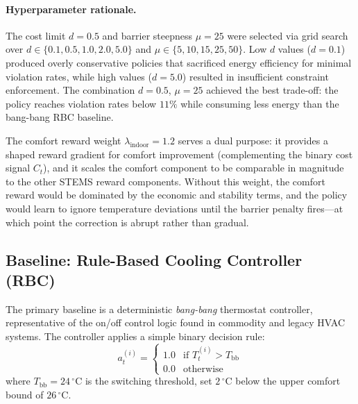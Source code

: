 \paragraph{Hyperparameter rationale.}
The cost limit $d = 0.5$ and barrier steepness $\mu = 25$ were selected via
grid search over $d \in \{0.1, 0.5, 1.0, 2.0, 5.0\}$ and
$\mu \in \{5, 10, 15, 25, 50\}$.  Low $d$ values ($d = 0.1$) produced overly
conservative policies that sacrificed energy efficiency for minimal violation
rates, while high values ($d = 5.0$) resulted in insufficient constraint
enforcement.  The combination $d = 0.5$, $\mu = 25$ achieved the best
trade-off: the policy reaches violation rates below $11\%$ while consuming
less energy than the bang-bang RBC baseline.

The comfort reward weight $\lambda_{\text{indoor}} = 1.2$ serves a dual
purpose: it provides a shaped reward gradient for comfort improvement
(complementing the binary cost signal $C_t$), and it scales the comfort
component to be comparable in magnitude to the other STEMS reward components.
Without this weight, the comfort reward would be dominated by the economic and
stability terms, and the policy would learn to ignore temperature deviations
until the barrier penalty fires---at which point the correction is abrupt
rather than gradual.

\subsection{Baseline: Rule-Based Cooling Controller (RBC)}
\label{sec:temp-rbc}

The primary baseline is a deterministic \emph{bang-bang} thermostat controller,
representative of the on/off control logic found in commodity and legacy HVAC
systems.  The controller applies a simple binary decision rule:
\begin{equation}
  a_t^{(i)} =
  \begin{cases}
    1.0 & \text{if } T_t^{(i)} > T_{\text{bb}} \\
    0.0 & \text{otherwise}
  \end{cases}
  \label{eq:bangbang-rbc}
\end{equation}
where $T_{\text{bb}} = 24\,^\circ$C is the switching threshold, set
$2\,^\circ$C below the upper comfort bound of $26\,^\circ$C.

